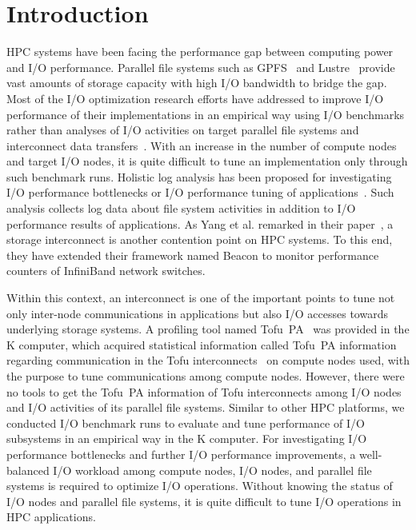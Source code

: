 \documentclass{jhps}
\begin{document}
\section{Introduction}

HPC systems have been facing the performance gap between computing power and I/O performance.
Parallel file systems such as GPFS~\cite{gpfs:usenix02} and Lustre~\cite{lustre:web} provide
vast amounts of storage capacity with high I/O bandwidth to bridge the gap.
Most of the I/O optimization research efforts have addressed to improve
I/O performance of their implementations in an empirical way using I/O benchmarks
rather than analyses of I/O activities on target parallel file systems
and interconnect
data transfers~\cite{behzad:sc13,bhimji:cug16,tessier:com-hpc16,vazhkudai:sc18,oral:sc19}.
With an increase in the number of compute nodes and target I/O nodes,
it is quite difficult to tune an implementation only through such benchmark runs.
Holistic log analysis has been proposed for investigating I/O performance bottlenecks
or I/O performance tuning
of applications~\cite{lockwood:cug18,wang:cluster18,yang:nsdi2019}.
Such analysis collects log data about file system activities in addition to
I/O performance results of applications.
As Yang et al. remarked in their paper~\cite{yang:nsdi2019},
a storage interconnect is another contention point on HPC systems.
To this end, they have extended their framework named Beacon
to monitor performance counters of InfiniBand network switches.

Within this context, an interconnect is one of the important points
to tune not only inter-node communications in applications
but also I/O accesses towards underlying storage systems.
A profiling tool named Tofu~PA~\cite{profiler:fujitsu-tech-si}
was provided in the K computer, which acquired statistical information called Tofu~PA information
regarding communication in the Tofu interconnects~\cite{tofu:micro2012}
on compute nodes used, with the purpose to tune communications among compute nodes.
However, there were no tools to get the Tofu~PA information of Tofu interconnects
among I/O nodes and I/O activities of its parallel file systems.
Similar to other HPC platforms, we conducted I/O benchmark runs
to evaluate and tune performance of I/O subsystems in an empirical way
in the K computer.
For investigating I/O performance bottlenecks and further I/O performance improvements,
a well-balanced I/O workload among compute nodes, I/O nodes, and parallel file systems
is required to optimize I/O operations.
Without knowing the status of I/O nodes and parallel file systems,
it is quite difficult to tune I/O operations in HPC applications.
\end{document}
